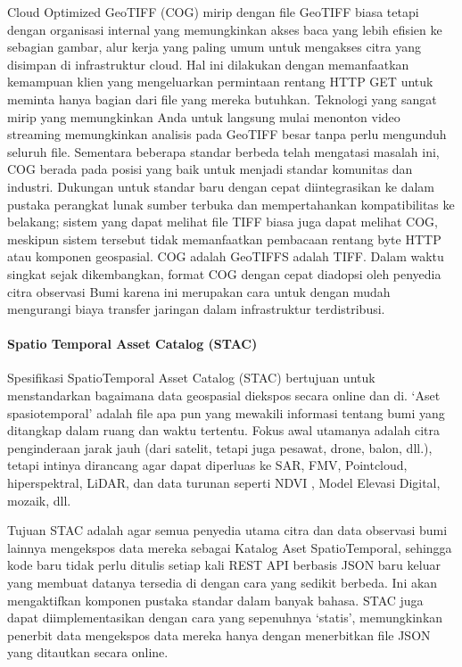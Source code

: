 \documentclass[letterpaper,10pt,english]{sphinxmanual}
\begin{document}
Cloud Optimized GeoTIFF (COG) mirip dengan file GeoTIFF biasa tetapi dengan organisasi internal yang memungkinkan akses baca yang lebih efisien ke sebagian gambar, alur kerja yang paling umum untuk mengakses citra yang disimpan di infrastruktur cloud. Hal ini dilakukan dengan memanfaatkan kemampuan klien yang mengeluarkan permintaan rentang HTTP GET untuk meminta hanya bagian dari file yang mereka butuhkan. Teknologi yang sangat mirip yang memungkinkan Anda untuk langsung mulai menonton video streaming memungkinkan analisis pada GeoTIFF besar tanpa perlu mengunduh seluruh file.
Sementara beberapa standar berbeda telah mengatasi masalah ini, COG berada pada posisi yang baik untuk menjadi standar komunitas dan industri. Dukungan untuk standar baru dengan cepat diintegrasikan ke dalam pustaka perangkat lunak sumber terbuka dan mempertahankan kompatibilitas ke belakang; sistem yang dapat melihat file TIFF biasa juga dapat melihat COG, meskipun sistem tersebut tidak memanfaatkan pembacaan rentang byte HTTP atau komponen geospasial. COG adalah GeoTIFFS adalah TIFF. Dalam waktu singkat sejak dikembangkan, format COG dengan cepat diadopsi oleh penyedia citra observasi Bumi karena ini merupakan cara untuk dengan mudah mengurangi biaya transfer jaringan dalam infrastruktur terdistribusi.


\paragraph{Spatio Temporal Asset Catalog (STAC)}
\label{\detokenize{sesi3/interoperabilitas:spatio-temporal-asset-catalog-stac}}

Spesifikasi SpatioTemporal Asset Catalog (STAC) bertujuan untuk menstandarkan bagaimana data geospasial diekspos secara online dan di. ‘Aset spasiotemporal’ adalah file apa pun yang mewakili informasi tentang bumi yang ditangkap dalam ruang dan waktu tertentu. Fokus awal utamanya adalah citra penginderaan jarak jauh (dari satelit, tetapi juga pesawat, drone, balon, dll.), tetapi intinya dirancang agar dapat diperluas ke SAR, FMV, Point\sphinxhyphen{}cloud, hiperspektral, LiDAR, dan data turunan seperti NDVI , Model Elevasi Digital, mozaik, dll.

Tujuan STAC adalah agar semua penyedia utama citra dan data observasi bumi lainnya mengekspos data mereka sebagai Katalog Aset SpatioTemporal, sehingga kode baru tidak perlu ditulis setiap kali REST API berbasis JSON baru keluar yang membuat datanya tersedia di dengan cara yang sedikit berbeda. Ini akan mengaktifkan komponen pustaka standar dalam banyak bahasa. STAC juga dapat diimplementasikan dengan cara yang sepenuhnya ‘statis’, memungkinkan penerbit data mengekspos data mereka hanya dengan menerbitkan file JSON yang ditautkan secara online.
\end{document}
